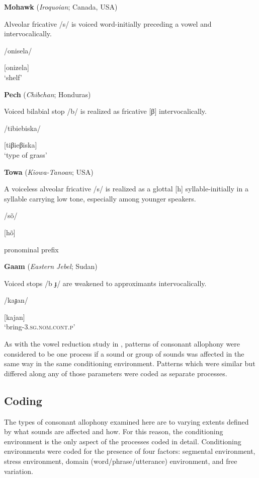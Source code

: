 \ea\label{ex:7.14}
  \textbf{Mohawk} (\textit{Iroquoian}; Canada, USA)

Alveolar fricative /s/ is voiced word-initially preceding a vowel and intervocalically.

/onisela/

[onizela]\\
\glt ‘shelf’
\citep[30-1]{Bonvillain1973}
\z

\ea\label{ex:7.15}
  \textbf{Pech} (\textit{Chibchan}; Honduras)

Voiced bilabial stop /b/ is realized as fricative [β] intervocalically.

/tibiebiska/

[tiβieβiska]\\
\glt ‘type of grass’
\citep[16]{Holt1999}
\z

\ea\label{ex:7.16}
  \textbf{Towa} (\textit{Kiowa-Tanoan}; USA)

A voiceless alveolar fricative /s/ is realized as a glottal [h] syllable-initially in a syllable carrying low tone, especially among younger speakers.

/sõ/

[hõ]

pronominal prefix
\citep[13]{Yumitani1998}
\z

\ea\label{ex:7.17}
  \textbf{Gaam} (\textit{Eastern Jebel}; Sudan)

Voiced stops /b ɟ/ are weakened to approximants intervocalically.

/kaɟan/

[kajan]\\
\glt ‘bring-3.\textsc{sg.nom.cont.p}’
\citep[24-5]{Stirtz2011}
\z

  As with the vowel reduction study in , patterns of consonant allophony were considered to be one process if a sound or group of sounds was affected in the same way in the same conditioning environment. Patterns which were similar but differed along any of those parameters were coded as separate processes.

\subsection{Coding}\label{sec:7.2.2}

  The types of consonant allophony examined here are to varying extents defined by what sounds are affected and how. For this reason, the conditioning environment is the only aspect of the processes coded in detail. Conditioning environments were coded for the presence of four factors: segmental environment, stress environment, domain (word/phrase/utterance) environment, and free variation.

